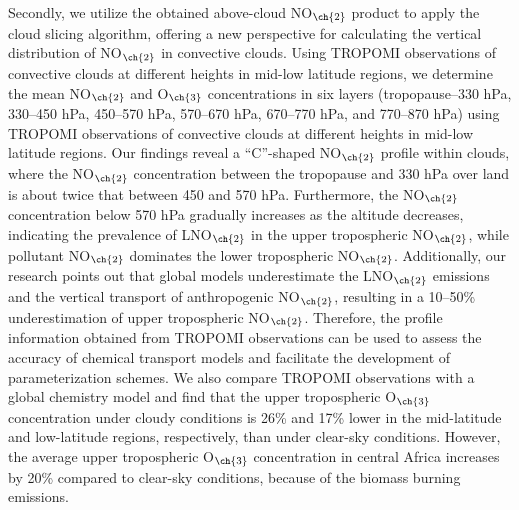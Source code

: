 {Secondly, we utilize the obtained above-cloud NO$_{\ch{2}}$ product to apply the cloud slicing algorithm, offering a new perspective for calculating the vertical distribution of NO$_{\ch{2}}$ in convective clouds.
Using TROPOMI observations of convective clouds at different heights in mid-low latitude regions, we determine the mean NO$_{\ch{2}}$ and O$_{\ch{3}}$ concentrations in six layers (tropopause--330 hPa, 330--450 hPa, 450--570 hPa, 570--670 hPa, 670--770 hPa, and 770--870 hPa) using TROPOMI observations of convective clouds at different heights in mid-low latitude regions.
Our findings reveal a ``C''-shaped NO$_{\ch{2}}$ profile within clouds, where the NO$_{\ch{2}}$ concentration between the tropopause and 330 hPa over land is about twice that between 450 and 570 hPa.
Furthermore, the NO$_{\ch{2}}$ concentration below 570 hPa gradually increases as the altitude decreases, indicating the prevalence of LNO$_{\ch{2}}$ in the upper tropospheric NO$_{\ch{2}}$, while pollutant NO$_{\ch{2}}$ dominates the lower tropospheric NO$_{\ch{2}}$.
Additionally, our research points out that global models underestimate the LNO$_{\ch{2}}$ emissions and the vertical transport of anthropogenic NO$_{\ch{2}}$, resulting in a 10--50\% underestimation of upper tropospheric NO$_{\ch{2}}$.
Therefore, the profile information obtained from TROPOMI observations can be used to assess the accuracy of chemical transport models and facilitate the development of parameterization schemes.
We also compare TROPOMI observations with a global chemistry model and find that the upper tropospheric O$_{\ch{3}}$ concentration under cloudy conditions is 26\% and 17\% lower in the mid-latitude and low-latitude regions, respectively, than under clear-sky conditions.
However, the average upper tropospheric O$_{\ch{3}}$ concentration in central Africa increases by 20\% compared to clear-sky conditions, because of the biomass burning emissions.

}
